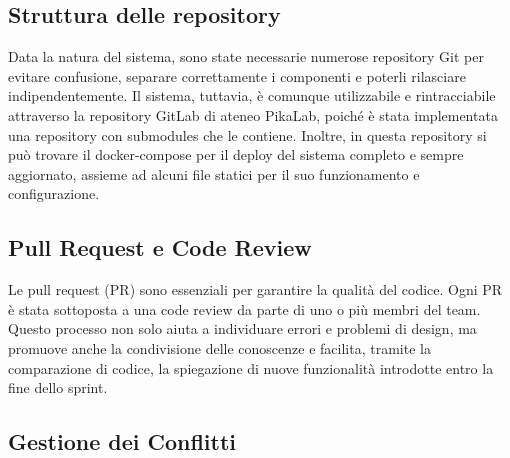 
\subsection{Struttura delle repository}

Data la natura del sistema, sono state necessarie numerose repository Git per evitare confusione, separare correttamente i componenti e poterli rilasciare indipendentemente.
Il sistema, tuttavia, è comunque utilizzabile e rintracciabile attraverso la repository GitLab di ateneo PikaLab, poiché è stata implementata una repository con submodules che le contiene. 
Inoltre, in questa repository si può trovare il docker-compose per il deploy del sistema completo e sempre aggiornato, assieme ad alcuni file statici per il suo funzionamento e configurazione.

\subsection{Pull Request e Code Review}

Le pull request (PR) sono essenziali per garantire la qualità del codice. Ogni PR è stata sottoposta a una code review da parte di uno o più membri del team. 
Questo processo non solo aiuta a individuare errori e problemi di design, ma promuove anche la condivisione delle conoscenze e facilita, tramite la 
comparazione di codice, la spiegazione di nuove funzionalità introdotte entro la fine dello sprint.


\subsection{Gestione dei Conflitti}

